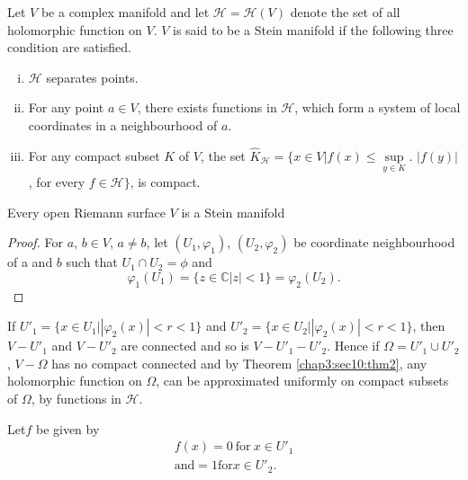 \begin{defi*}%
  Let $V$ be a complex manifold and let $\mathscr{H} = \mathscr{H}
  (V)$ denote the set of all holomorphic function on $V$. $V$ is said
  to be a Stein manifold if the following three condition are
  satisfied. 
  \begin{enumerate}[(i)]
  \item $\mathscr{H}$ separates points.
  \item For any point $a \in V$, there exists functions in
    $\mathscr{H}$, which form a system of local coordinates in a
    neighbourhood of $a$. 
  \item For any compact subset $K$ of $V$, the set
    $\hat{K}_{\mathscr{H}} = \{ x \in V  | f(x) \leq \sup\limits_{y
    \in K}$. $|f(y)|$, for every $f \in \mathscr{H} \}$, is compact. 
  \end{enumerate}
\end{defi*}

\begin{theorem}\label{chap3:sec10:thm3}%
  Every open Riemann surface $V$ is a Stein manifold
\end{theorem}

\begin{proof}
  For $a$, $b \in V$, $a \neq b$, let $(U_1, \varphi_1 )$, $(U_2,
  \varphi_2)$ be coordinate neighbourhood of a and $b$ such that $U_1
  \cap U_2 = \phi$ and 
  $$
  \varphi _1 (U_1) = \{ z \in \mathbb{C} |z| < 1 \} = \varphi_2 (U_2).
  $$
\end{proof}

If $U'_1 = \{ x \in U_1 \Big| |\varphi_2 (x)| < r < 1 \}$ and $U'_2 = \{ x
\in U_2 \Big| |\varphi_2 (x)| < r < 1 \}$, then $V- U'_1$ and $V - U'_2$
are connected and so is $V-U'_1 - U'_2$. Hence if $\Omega = U'_1 \cup
U'_2$, $V - \Omega$ has no compact connected and by
Theorem \ref{chap3:sec10:thm2}, any
holomorphic function on $\Omega$, can be approximated uniformly on
compact subsets of $\Omega$, by functions in $\mathscr{H}$. 

Let\pageoriginale $f$ be given by
\begin{gather*}
  f(x) = 0 ~\text{for}~ x \in U'_1\\
  \text{and} = 1 \text{for} x \in U'_2.
\end{gather*}

